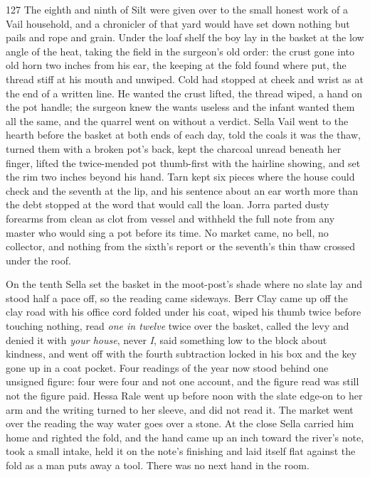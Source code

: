 \begin{CRchronicle}{127}
The eighth and ninth of Silt were given over to the small honest work of a Vail household, and a chronicler of that yard would have set down nothing but pails and rope and grain. Under the loaf shelf the boy lay in the basket at the low angle of the heat, taking the field in the surgeon’s old order: the crust gone into old horn two inches from his ear, the keeping at the fold found where put, the thread stiff at his mouth and unwiped. Cold had stopped at cheek and wrist as at the end of a written line. He wanted the crust lifted, the thread wiped, a hand on the pot handle; the surgeon knew the wants useless and the infant wanted them all the same, and the quarrel went on without a verdict. Sella Vail went to the hearth before the basket at both ends of each day, told the coals it was the thaw, turned them with a broken pot’s back, kept the charcoal unread beneath her finger, lifted the twice-mended pot thumb-first with the hairline showing, and set the rim two inches beyond his hand. Tarn kept six pieces where the house could check and the seventh at the lip, and his sentence about an ear worth more than the debt stopped at the word that would call the loan. Jorra parted dusty forearms from clean as clot from vessel and withheld the full note from any master who would sing a pot before its time. No market came, no bell, no collector, and nothing from the sixth’s report or the seventh’s thin thaw crossed under the roof.

On the tenth Sella set the basket in the moot-post’s shade where no slate lay and stood half a pace off, so the reading came sideways. Berr Clay came up off the clay road with his office cord folded under his coat, wiped his thumb twice before touching nothing, read \emph{one in twelve} twice over the basket, called the levy and denied it with \emph{your house}, never \emph{I}, said something low to the block about kindness, and went off with the fourth subtraction locked in his box and the key gone up in a coat pocket. Four readings of the year now stood behind one unsigned figure: four were four and not one account, and the figure read was still not the figure paid. Hessa Rale went up before noon with the slate edge-on to her arm and the writing turned to her sleeve, and did not read it. The market went over the reading the way water goes over a stone. At the close Sella carried him home and righted the fold, and the hand came up an inch toward the river’s note, took a small intake, held it on the note’s finishing and laid itself flat against the fold as a man puts away a tool. There was no next hand in the room.
\end{CRchronicle}

